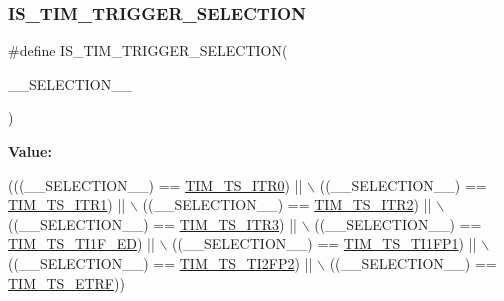 \subsubsection{\texorpdfstring{I\+S\+\_\+\+T\+I\+M\+\_\+\+T\+R\+I\+G\+G\+E\+R\+\_\+\+S\+E\+L\+E\+C\+T\+I\+ON}{IS\_TIM\_TRIGGER\_SELECTION}}
{\footnotesize\ttfamily \#define I\+S\+\_\+\+T\+I\+M\+\_\+\+T\+R\+I\+G\+G\+E\+R\+\_\+\+S\+E\+L\+E\+C\+T\+I\+ON(\begin{DoxyParamCaption}\item[{}]{\+\_\+\+\_\+\+S\+E\+L\+E\+C\+T\+I\+O\+N\+\_\+\+\_\+ }\end{DoxyParamCaption})}

{\bfseries Value\+:}
\begin{DoxyCode}
(((\_\_SELECTION\_\_) == \hyperlink{group___t_i_m___trigger___selection_gab7cf2b7db3956d4fd1e5a5d84f4891e7}{TIM\_TS\_ITR0}) || \(\backslash\)
                                                 ((\_\_SELECTION\_\_) == \hyperlink{group___t_i_m___trigger___selection_gad90fbca297153ca9c0112a67ea2c6cb3}{TIM\_TS\_ITR1}) || \(\backslash\)
                                                 ((\_\_SELECTION\_\_) == \hyperlink{group___t_i_m___trigger___selection_ga8599ba58a5f911d648503c7ac55d4320}{TIM\_TS\_ITR2}) || \(\backslash\)
                                                 ((\_\_SELECTION\_\_) == \hyperlink{group___t_i_m___trigger___selection_ga63183e611b91c5847040172c0069514d}{TIM\_TS\_ITR3}) || \(\backslash\)
                                                 ((\_\_SELECTION\_\_) == 
      \hyperlink{group___t_i_m___trigger___selection_ga8c89554efc693e679c94b5a749af123c}{TIM\_TS\_TI1F\_ED}) || \(\backslash\)
                                                 ((\_\_SELECTION\_\_) == 
      \hyperlink{group___t_i_m___trigger___selection_ga38d3514d54bcdb0ea8ac8bd91c5832b5}{TIM\_TS\_TI1FP1}) || \(\backslash\)
                                                 ((\_\_SELECTION\_\_) == 
      \hyperlink{group___t_i_m___trigger___selection_ga0ed58a269bccd3f22d19cc9a2ba3123f}{TIM\_TS\_TI2FP2}) || \(\backslash\)
                                                 ((\_\_SELECTION\_\_) == \hyperlink{group___t_i_m___trigger___selection_gaece08e02e056613a882aa7ff0a6ccc2d}{TIM\_TS\_ETRF}))
\end{DoxyCode}
\mbox{\label{group___t_i_m___private___macros_ga4389836fe0783c8661deb7b7d58dd217}} 
